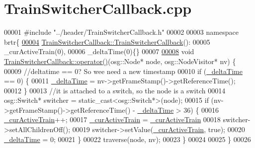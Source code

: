 \hypertarget{_train_switcher_callback_8cpp_source}{\section{Train\+Switcher\+Callback.\+cpp}
\label{_train_switcher_callback_8cpp_source}
}

\begin{DoxyCode}
00001 \textcolor{preprocessor}{#include "../header/TrainSwitcherCallback.h"}
00002 
00003 \textcolor{keyword}{namespace }brtr\{
\hypertarget{_train_switcher_callback_8cpp_source_l00004}{}\hyperlink{classbrtr_1_1_train_switcher_callback_a54ad53b07976bf34af2a0e6061088f3c}{00004}     \hyperlink{classbrtr_1_1_train_switcher_callback_a54ad53b07976bf34af2a0e6061088f3c}{TrainSwitcherCallback::TrainSwitcherCallback}():
00005         \_curActiveTrain(0),
00006         \_deltaTime(0)\{\}
00007 
\hypertarget{_train_switcher_callback_8cpp_source_l00008}{}\hyperlink{classbrtr_1_1_train_switcher_callback_a5a8182c650febc07a8443f6a35c32087}{00008}     \textcolor{keywordtype}{void} \hyperlink{classbrtr_1_1_train_switcher_callback_a5a8182c650febc07a8443f6a35c32087}{TrainSwitcherCallback::operator()}(osg::Node* node, 
      osg::NodeVisitor* nv) \{
00009         \textcolor{comment}{//deltatime == 0? So wee need a new timestamp}
00010         \textcolor{keywordflow}{if} (\hyperlink{classbrtr_1_1_train_switcher_callback_a1d2fbe75d19ca03cba449cdf4277f0eb}{\_deltaTime} == 0) \{
00011             \hyperlink{classbrtr_1_1_train_switcher_callback_a1d2fbe75d19ca03cba449cdf4277f0eb}{\_deltaTime} = nv->getFrameStamp()->getReferenceTime();
00012         \}
00013         \textcolor{comment}{//it is attached to a switch, so the node is a switch}
00014         osg::Switch* switcher = \textcolor{keyword}{static\_cast<}osg::Switch*\textcolor{keyword}{>}(node);
00015         \textcolor{keywordflow}{if} (nv->getFrameStamp()->getReferenceTime() - \hyperlink{classbrtr_1_1_train_switcher_callback_a1d2fbe75d19ca03cba449cdf4277f0eb}{\_deltaTime} > 36) \{
00016             \hyperlink{classbrtr_1_1_train_switcher_callback_ac87e64555ad379814a93220447c49257}{\_curActiveTrain}++;
00017             \hyperlink{classbrtr_1_1_train_switcher_callback_ac87e64555ad379814a93220447c49257}{\_curActiveTrain} = \hyperlink{classbrtr_1_1_train_switcher_callback_ac87e64555ad379814a93220447c49257}{\_curActiveTrain} %
00018             switcher->setAllChildrenOff();
00019             switcher->setValue(\hyperlink{classbrtr_1_1_train_switcher_callback_ac87e64555ad379814a93220447c49257}{\_curActiveTrain}, \textcolor{keyword}{true});
00020             \hyperlink{classbrtr_1_1_train_switcher_callback_a1d2fbe75d19ca03cba449cdf4277f0eb}{\_deltaTime} = 0;
00021         \}
00022         traverse(node, nv);
00023     \}
00024 
00025 \}
00026 
\end{DoxyCode}
